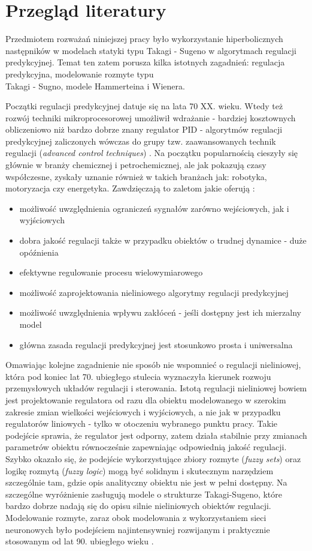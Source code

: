 \chapter{Przegląd literatury}
Przedmiotem rozważań niniejszej pracy było wykorzystanie hiperbolicznych następników w modelach statyki typu Takagi - Sugeno w algorytmach regulacji predykcyjnej. Temat ten zatem porusza kilka istotnych zagadnień: regulacja predykcyjna, modelowanie rozmyte typu \\ Takagi - Sugno, modele Hammerteina i Wienera.

Początki regulacji predykcyjnej datuje się na lata 70 XX. wieku. Wtedy też rozwój techniki mikroprocesorowej umożliwił wdrażanie - bardziej kosztownych obliczeniowo niż bardzo dobrze znany regulator PID - algorytmów regulacji predykcyjnej zaliczonych wówczas do grupy tzw. zaawansowanych technik regulacji (\textit{advanced control techniques}) \cite{35}. Na początku popularnością cieszyły się głównie w branży chemicznej i petrochemicznej, ale jak pokazują czasy współczesne, zyskały uznanie również w takich branżach jak: robotyka, motoryzacja czy energetyka. Zawdzięczają to zaletom jakie oferują \cite{160, 170, 120}:
\begin{itemize}
\item możliwość uwzględnienia ograniczeń sygnałów zarówno wejściowych, jak i wyjściowych
\item dobra jakość regulacji także w przypadku obiektów o trudnej dynamice - duże opóźnienia
\item efektywne regulowanie procesu wielowymiarowego
\item możliwość zaprojektowania nieliniowego algorytmy regulacji predykcyjnej 
\item możliwość uwzględnienia wpływu zakłóceń - jeśli dostępny jest ich mierzalny model 
\item główna zasada regulacji predykcyjnej jest stosunkowo prosta i uniwersalna
\end{itemize}

Omawiając kolejne zagadnienie nie sposób nie wspomnieć o regulacji nieliniowej, która pod koniec lat 70. ubiegłego stulecia wyznaczyła kierunek rozwoju przemysłowych układów regulacji i sterowania. Istotą regulacji nieliniowej bowiem jest projektowanie regulatora od razu dla obiektu modelowanego w szerokim zakresie zmian wielkości wejściowych i wyjściowych, a nie jak w przypadku regulatorów liniowych - tylko w otoczeniu wybranego punktu pracy. Takie podejście sprawia, że regulator jest odporny, zatem działa stabilnie przy zmianach parametrów obiektu równocześnie zapewniając odpowiednią jakość regulacji. Szybko okazało się, że podejście wykorzystujące zbiory rozmyte (\textit{fuzzy sets}) oraz logikę rozmytą (\textit{fuzzy logic}) mogą być solidnym i skutecznym narzędziem szczególnie tam, gdzie opis analityczny obiektu nie jest w pełni dostępny. Na szczególne wyróżnienie zasługują modele o strukturze Takagi-Sugeno, które bardzo dobrze nadają się do opisu silnie nieliniowych obiektów regulacji. Modelowanie rozmyte, zaraz obok modelowania z wykorzystaniem sieci neuronowych było podejściem najintensywniej rozwijanym i praktycznie stosowanym od lat 90. ubiegłego wieku \cite{160, 120}. 

